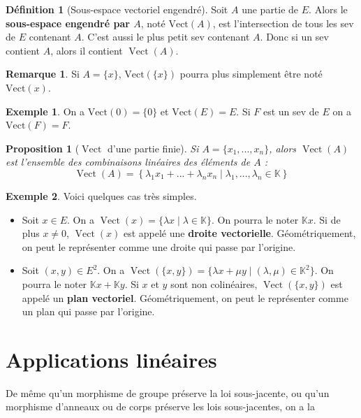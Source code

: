 \documentclass[french]{book}
\theoremstyle{plain}
\newtheorem{prop}{Proposition}[chapter]
\theoremstyle{definition}
\newtheorem{dfn}{Définition}[chapter]
\newtheorem{exa}{Exemple}[chapter]
\newtheorem{rmq}{Remarque}[chapter]
\theoremstyle{remark}
\DeclareMathOperator{\vect}{Vect}
\begin{document}
\begin{dfn}[Sous-espace vectoriel engendré]
	Soit $A$ une partie de $E$. Alors le \textbf{sous-espace engendré par $A$}, noté $\text{Vect}(A)$, est l'intersection de tous les sev de $E$ contenant $A$. C'est aussi le plus petit sev contenant $A$. Donc si un sev contient $A$, alors il contient $\vect(A)$.
\end{dfn}
\begin{rmq}
	Si $A = \{x\}$, $\text{Vect}(\{x\})$ pourra plus simplement être noté $\text{Vect}(x)$.
\end{rmq}
\begin{exa}
	On a $\text{Vect}(0) = \{0\}$ et $\text{Vect}(E) = E$. Si $F$ est un sev de $E$ on a $\text{Vect}(F) = F$.
\end{exa}
\begin{prop}[$\vect$ d'une partie finie]
	Si $A = \{x_1, ..., x_n\}$, alors $\vect(A)$ est l'ensemble des combinaisons linéaires des éléments de $A$ : $$\vect(A) = \left\{\lambda_1 x_1 + ... + \lambda_n x_n \mid \lambda_1, ..., \lambda_n \in \mathbb{K}\right\}$$
\end{prop}
\begin{exa}
	Voici quelques cas très simples.
	\begin{itemize}
		\item Soit $x \in E$. On a $\vect(x) = \{\lambda x \mid \lambda \in \mathbb{K}\}$. On pourra le noter $\mathbb{K}x$. Si de plus $x \neq 0$, $\vect(x)$ est appelé une \textbf{droite vectorielle}. Géométriquement, on peut le représenter comme une droite qui passe par l'origine.
		\item Soit $(x, y) \in E^2$. On a $\vect(\{x, y\}) = \{\lambda x + \mu y \mid (\lambda, \mu) \in \mathbb{K}^2\}$. On pourra le noter $\mathbb{K}x + \mathbb{K}y$. Si $x$ et $y$ sont non colinéaires, $\vect(\{x, y\})$ est appelé un \textbf{plan vectoriel}. Géométriquement, on peut le représenter comme un plan qui passe par l'origine.
	\end{itemize}
\end{exa}
\section{Applications linéaires}
De même qu'un morphisme de groupe préserve la loi sous-jacente, ou qu'un morphisme d'anneaux ou de corps préserve les lois sous-jacentes, on a la
\end{document}
